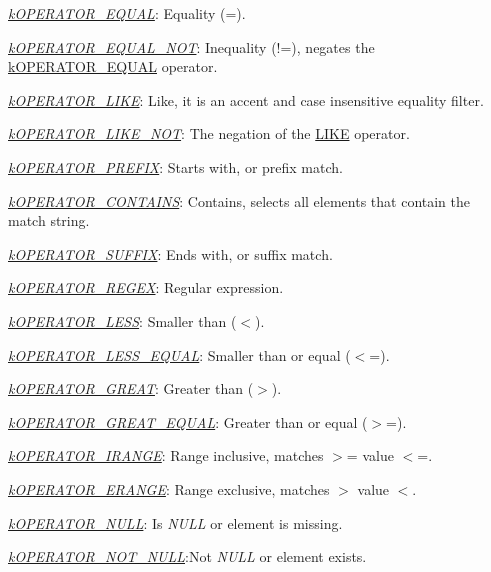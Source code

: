 \begin{DoxyItemize}
\begin{DoxyItemize}
\begin{DoxyItemize}
\begin{DoxyItemize}
\item {\itshape \hyperlink{}{k\-O\-P\-E\-R\-A\-T\-O\-R\-\_\-\-E\-Q\-U\-A\-L}}\-: Equality (=). 
\item {\itshape \hyperlink{}{k\-O\-P\-E\-R\-A\-T\-O\-R\-\_\-\-E\-Q\-U\-A\-L\-\_\-\-N\-O\-T}}\-: Inequality (!=), negates the \hyperlink{}{k\-O\-P\-E\-R\-A\-T\-O\-R\-\_\-\-E\-Q\-U\-A\-L} operator. 
\item {\itshape \hyperlink{}{k\-O\-P\-E\-R\-A\-T\-O\-R\-\_\-\-L\-I\-K\-E}}\-: Like, it is an accent and case insensitive equality filter. 
\item {\itshape \hyperlink{}{k\-O\-P\-E\-R\-A\-T\-O\-R\-\_\-\-L\-I\-K\-E\-\_\-\-N\-O\-T}}\-: The negation of the \hyperlink{}{L\-I\-K\-E} operator. 
\item {\itshape \hyperlink{}{k\-O\-P\-E\-R\-A\-T\-O\-R\-\_\-\-P\-R\-E\-F\-I\-X}}\-: Starts with, or prefix match. 
\item {\itshape \hyperlink{}{k\-O\-P\-E\-R\-A\-T\-O\-R\-\_\-\-C\-O\-N\-T\-A\-I\-N\-S}}\-: Contains, selects all elements that contain the match string. 
\item {\itshape \hyperlink{}{k\-O\-P\-E\-R\-A\-T\-O\-R\-\_\-\-S\-U\-F\-F\-I\-X}}\-: Ends with, or suffix match. 
\item {\itshape \hyperlink{}{k\-O\-P\-E\-R\-A\-T\-O\-R\-\_\-\-R\-E\-G\-E\-X}}\-: Regular expression. 
\item {\itshape \hyperlink{}{k\-O\-P\-E\-R\-A\-T\-O\-R\-\_\-\-L\-E\-S\-S}}\-: Smaller than ($<$). 
\item {\itshape \hyperlink{}{k\-O\-P\-E\-R\-A\-T\-O\-R\-\_\-\-L\-E\-S\-S\-\_\-\-E\-Q\-U\-A\-L}}\-: Smaller than or equal ($<$=). 
\item {\itshape \hyperlink{}{k\-O\-P\-E\-R\-A\-T\-O\-R\-\_\-\-G\-R\-E\-A\-T}}\-: Greater than ($>$). 
\item {\itshape \hyperlink{}{k\-O\-P\-E\-R\-A\-T\-O\-R\-\_\-\-G\-R\-E\-A\-T\-\_\-\-E\-Q\-U\-A\-L}}\-: Greater than or equal ($>$=). 
\item {\itshape \hyperlink{}{k\-O\-P\-E\-R\-A\-T\-O\-R\-\_\-\-I\-R\-A\-N\-G\-E}}\-: Range inclusive, matches $>$= value $<$=. 
\item {\itshape \hyperlink{}{k\-O\-P\-E\-R\-A\-T\-O\-R\-\_\-\-E\-R\-A\-N\-G\-E}}\-: Range exclusive, matches $>$ value $<$. 
\item {\itshape \hyperlink{}{k\-O\-P\-E\-R\-A\-T\-O\-R\-\_\-\-N\-U\-L\-L}}\-: Is {\itshape N\-U\-L\-L} or element is missing. 
\item {\itshape \hyperlink{}{k\-O\-P\-E\-R\-A\-T\-O\-R\-\_\-\-N\-O\-T\-\_\-\-N\-U\-L\-L}}\-:Not {\itshape N\-U\-L\-L} or element exists. 

\end{DoxyItemize}
\end{DoxyItemize}
\end{DoxyItemize}
\end{DoxyItemize}
